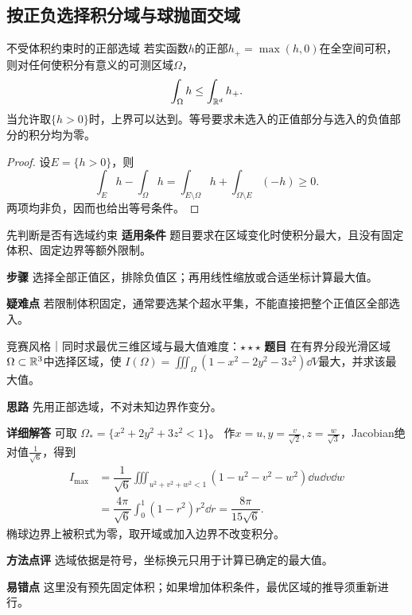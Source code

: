 \subsection{按正负选择积分域与球抛面交域}\label{cmi:regions}
\begin{theorem}{不受体积约束时的正部选域}
若实函数$h$的正部$h_+=\max(h,0)$在全空间可积，则对任何使积分有意义的可测区域$\Omega$，
\[
\int_\Omega h\le\int_{\mathbb{R}^d}h_+.
\]
当允许取$\{h>0\}$时，上界可以达到。等号要求未选入的正值部分与选入的负值部分的积分均为零。
\end{theorem}
\begin{proof}
设$E=\{h>0\}$，则
\[
\int_Eh-\int_\Omega h
=\int_{E\setminus\Omega}h+\int_{\Omega\setminus E}(-h)\ge0.
\]
两项均非负，因而也给出等号条件。
\end{proof}
\begin{method}{先判断是否有选域约束}
\textbf{适用条件} 题目要求在区域变化时使积分最大，且没有固定体积、固定边界等额外限制。\par
\textbf{步骤} 选择全部正值区，排除负值区；再用线性缩放或合适坐标计算最大值。\par
\textbf{疑难点} 若限制体积固定，通常要选某个超水平集，不能直接把整个正值区全部选入。
\end{method}
\begin{example}{竞赛风格｜同时求最优三维区域与最大值}{难度：$\star\star\star$}
\label{cmi:ex:positivepart}
\textbf{题目} 在有界分段光滑区域$\Omega\subset\mathbb{R}^3$中选择区域，使
$I(\Omega)=\iiint_\Omega(1-x^2-2y^2-3z^2)\dd V$最大，并求该最大值。\par
\textbf{思路} 先用正部选域，不对未知边界作变分。\par
\textbf{详细解答} 可取
$\Omega_*=\{x^2+2y^2+3z^2<1\}$。
作$x=u,y=\frac{v}{\sqrt2},z=\frac{w}{\sqrt3}$，Jacobian绝对值$\frac{1}{\sqrt6}$，得到
\[
\begin{aligned}
I_{\max}
&=\dfrac1{\sqrt6}\iiint_{u^2+v^2+w^2<1}(1-u^2-v^2-w^2)\dd u\dd v\dd w\\
&=\dfrac{4\pi}{\sqrt6}\int_0^1(1-r^2)r^2\dd r
=\dfrac{8\pi}{15\sqrt6}.
\end{aligned}
\]
椭球边界上被积式为零，取开域或加入边界不改变积分。\par
\textbf{方法点评} 选域依据是符号，坐标换元只用于计算已确定的最大值。\par
\textbf{易错点} 这里没有预先固定体积；如果增加体积条件，最优区域的推导须重新进行。
\end{example}

